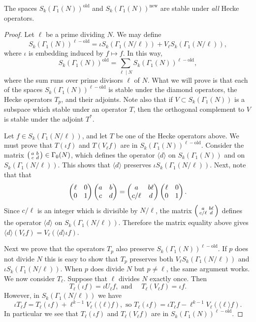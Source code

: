 \begin{theorem}
 The spaces  $S_k(\Gamma_1(N))^\text{old}$ and $S_k(\Gamma_1(N))^\text{new}$ are stable under \emph{all} Hecke operators.
\end{theorem}
\begin{proof}
  Let $\ell$ be a prime dividing $N$. We may define
\[
S_k(\Gamma_1(N))^{\ell-\text{old}} = \iota S_k(\Gamma_1(N/\ell)) + V_\ell S_k(\Gamma_1(N/\ell)),
\]
where $\iota$ is embedding induced by $f\mapsto f$. In this way,
\[
S_k(\Gamma_1(N))^\text{old} = \sum_{\ell \mid N} S_k(\Gamma_1(N))^{\ell-\text{old}},
\]
where the sum runs over prime divisors $\ell$ of $N$. What we will prove is that each of the spaces $S_k(\Gamma_1(N))^{\ell-\text{old}}$ is stable under the diamond operators, the Hecke operators $T_p$, and their adjoints. Note also that if $V\subset S_k(\Gamma_1(N))$ is a subspace which stable under an operator $T$, then the orthogonal complement to $V$ is stable under the adjoint $T^*$.

Let $f\in S_k(\Gamma_1(N/\ell))$, and let $T$ be one of the Hecke operators above. We must prove that $T(\iota f)$ and $T(V_\ell f)$ are in $S_k(\Gamma_1(N))^{\ell-\text{old}}$. Consider the matrix $\left(\begin{smallmatrix}a&b\\c&d\end{smallmatrix}\right) \in \Gamma_0(N)$, which defines the operator $\langle d\rangle$ on $S_k(\Gamma_1(N))$ and on $S_k(\Gamma_1(N/\ell))$. This shows that $\langle d\rangle$ preserves $\iota S_k(\Gamma_1(N/\ell))$. Next, note that that
\[
\left(\begin{matrix}\ell&0\\0&1\end{matrix}\right)\left(\begin{matrix}a&b\\c&d\end{matrix}\right) = \left(\begin{matrix}a&b\ell\\c/\ell&d\end{matrix}\right) \left(\begin{matrix}\ell&0\\0&1\end{matrix}\right).
\]
Since $c/\ell$ is an integer which is divisible by $N/\ell$, the matrix $\left(\begin{smallmatrix}a&b\ell\\c/\ell&d\end{smallmatrix}\right)$ defines the operator $\langle d\rangle$ on $S_k(\Gamma_1(N/\ell))$. Therefore the matrix equality above gives $\langle d\rangle(V_\ell f) = V_\ell(\langle d\rangle \iota f)$.

Next we prove that the operators $T_p$ also preserve $S_k(\Gamma_1(N))^{\ell-\text{old}}$. If $p$ does not divide $N$ this is easy to show that $T_p$ preserves both $V_\ell S_k(\Gamma_1(N/\ell))$ and $\iota S_k(\Gamma_1(N/\ell))$. When $p$ does divide $N$ but $p\neq \ell$, the same argument works. We now consider $T_\ell$. Suppose that $\ell$ divides $N$ exactly once. Then
\[
T_\ell(\iota f) = \iota U_\ell f,\text{ and }\quad T_\ell(V_\ell f) = \iota f.
\]
However, in $S_k(\Gamma_1(N/\ell))$ we have
\[
\iota T_\ell f = T_\ell (\iota f ) + \ell^{k-1}V_\ell(\langle \ell\rangle f),\text{ so } T_\ell(\iota f) = \iota T_\ell f - \ell^{k-1} V_\ell(\langle\ell\rangle f).
\]
In particular we see that $T_\ell(\iota f)$ and $T_\ell(V_\ell f)$ are in $S_k(\Gamma_1(N))^{\ell-\text{old}}$.


\end{proof}
